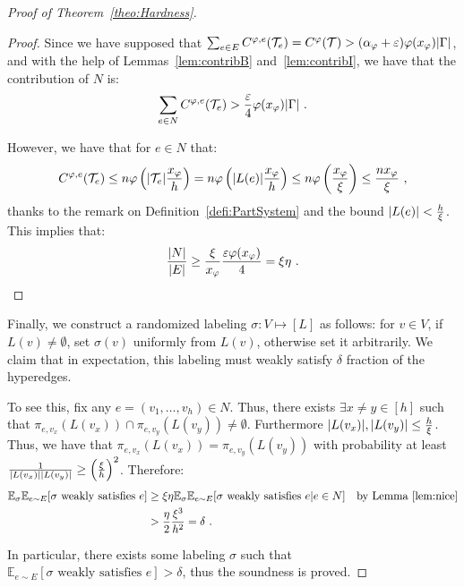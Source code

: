 \begin{proof}[Proof of Theorem~\ref{theo:Hardness}]
\begin{proof}
Since we have supposed that $\sum_{e \in E} C^{\varphi,e}(\mathcal{T}_e) = C^{\varphi}(\mathcal{T}) > (\alpha_{\varphi} + \varepsilon)\varphi(x_{\varphi})\abs{\Gamma}$, and with the help of Lemmas~\ref{lem:contribB} and~\ref{lem:contribI}, we have that the contribution of $N$ is:
\[\sum_{e \in N}  C^{\varphi,e}(\mathcal{T}_e) > \frac{\varepsilon}{4}\varphi(x_{\varphi})\abs{\Gamma}\ .\]

However, we have that for $e \in N$ that:
\[ C^{\varphi,e}(\mathcal{T}_e) \leq  n\varphi\left(\abs{\mathcal{T}_e}\frac{x_{\varphi}}{h}\right) = n\varphi\left(\abs{L(e)}\frac{x_{\varphi}}{h}\right) \leq n \varphi\left(\frac{x_{\varphi}}{\xi}\right) \leq \frac{nx_{\varphi}}{\xi} \ ,\]
thanks to the remark on Definition~\ref{defi:PartSystem} and the bound $\abs{L(e)} < \frac{h}{\xi}$. This implies that:
\[\frac{\abs{N}}{\abs{E}} \geq \frac{\xi}{x_{\varphi}}\frac{\varepsilon \varphi(x_{\varphi})}{4} = \xi \eta \ .\]
\end{proof}

Finally, we construct a randomized labeling $\sigma : V \mapsto [L]$ as follows: for $v \in V$, if $L(v) \not= \emptyset$, set $\sigma(v)$ uniformly from $L(v)$, otherwise set it arbitrarily. We claim that in expectation, this labeling must weakly satisfy $\delta$ fraction of the hyperedges.

To see this, fix any $e = (v_1,\ldots,v_h) \in N$. Thus, there exists $\exists x \not= y \in [h]$ such that $\pi_{e,v_x}(L(v_x)) \cap \pi_{e,v_y}(L(v_y)) \not= \emptyset$. Furthermore $\abs{L(v_x)},\abs{L(v_y)} \leq \frac{h}{\xi}$. Thus, we have that $\pi_{e,v_x}(L(v_x)) = \pi_{e,v_y}(L(v_y))$ with probability at least $\frac{1}{\abs{L(v_x)}\abs{L(v_y)}} \geq \left(\frac{\xi}{h}\right)^2$. Therefore:
\begin{equation}
  \begin{aligned}
    \mathbb{E}_{\sigma}\mathbb{E}_{e \sim E}[\sigma \text{ weakly satisfies } e] &\geq \xi \eta \mathbb{E}_{\sigma}\mathbb{E}_{e \sim E}[\sigma \text{ weakly satisfies } e | e \in N] \quad \text{by Lemma~\ref{lem:nice}}\\
    &> \frac{\eta}{2} \frac{\xi^3}{h^2} = \delta \ .
  \end{aligned}
\end{equation}

In particular, there exists some labeling $\sigma$ such that $\mathbb{E}_{e \sim E}[\sigma \text{ weakly satisfies } e] > \delta$, thus the soundness is proved.
\end{proof}

